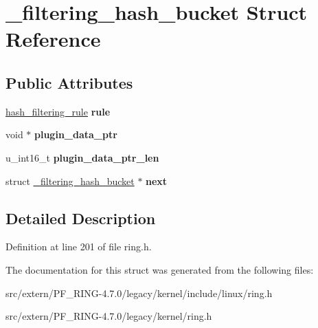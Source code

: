 \hypertarget{struct__filtering__hash__bucket}{
\section{\_\-filtering\_\-hash\_\-bucket Struct Reference}
\label{struct__filtering__hash__bucket}
}
\subsection*{Public Attributes}
\begin{DoxyCompactItemize}
\item 
\hypertarget{struct__filtering__hash__bucket_adbc4dc181b1e431f437ae21ba73c4034}{
\hyperlink{structhash__filtering__rule}{hash\_\-filtering\_\-rule} {\bfseries rule}}
\label{struct__filtering__hash__bucket_adbc4dc181b1e431f437ae21ba73c4034}

\item 
\hypertarget{struct__filtering__hash__bucket_a172fa439428e60a73b81cf036a23257d}{
void $\ast$ {\bfseries plugin\_\-data\_\-ptr}}
\label{struct__filtering__hash__bucket_a172fa439428e60a73b81cf036a23257d}

\item 
\hypertarget{struct__filtering__hash__bucket_a7ba92762de7d4fdb5438b57346ce8d4f}{
u\_\-int16\_\-t {\bfseries plugin\_\-data\_\-ptr\_\-len}}
\label{struct__filtering__hash__bucket_a7ba92762de7d4fdb5438b57346ce8d4f}

\item 
\hypertarget{struct__filtering__hash__bucket_acf31119d3141034e20e87077bd4b23a9}{
struct \hyperlink{struct__filtering__hash__bucket}{\_\-filtering\_\-hash\_\-bucket} $\ast$ {\bfseries next}}
\label{struct__filtering__hash__bucket_acf31119d3141034e20e87077bd4b23a9}

\end{DoxyCompactItemize}


\subsection{Detailed Description}


Definition at line 201 of file ring.h.



The documentation for this struct was generated from the following files:\begin{DoxyCompactItemize}
\item 
src/extern/PF\_\-RING-\/4.7.0/legacy/kernel/include/linux/ring.h\item 
src/extern/PF\_\-RING-\/4.7.0/legacy/kernel/ring.h\end{DoxyCompactItemize}
